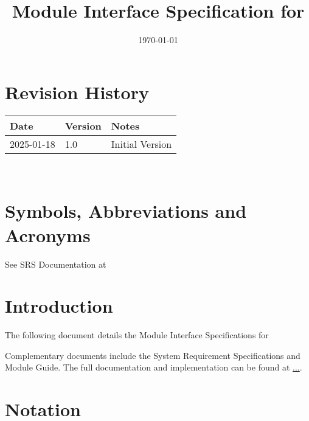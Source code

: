 \documentclass[12pt, titlepage]{article}
\begin{document}
\title{Module Interface Specification for \progname{}}

\author{\authname}

\date{\today}

\maketitle


\section{Revision History}

\begin{tabularx}{\textwidth}{p{3cm}p{2cm}X}
  \toprule {\bf Date} & {\bf Version} & {\bf Notes} \\
  \midrule
  2025-01-18              & 1.0           & Initial Version       \\
  \bottomrule
\end{tabularx}

~\newpage

\section{Symbols, Abbreviations and Acronyms}

See SRS Documentation at 


\newpage

\tableofcontents

\newpage


\section{Introduction}

The following document details the Module Interface Specifications for

Complementary documents include the System Requirement Specifications
and Module Guide.  The full documentation and implementation can be
found at \url{...}.  

\section{Notation}
\end{document}
